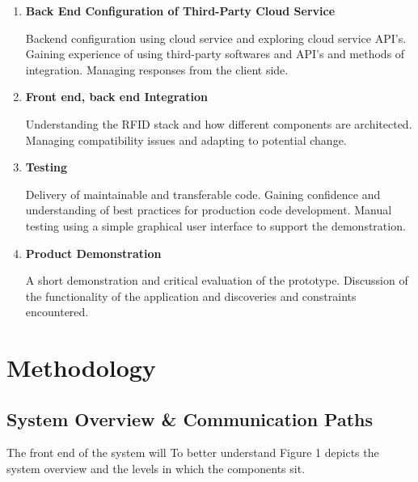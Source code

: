 \documentclass[a4paper, 11pt]{article}
\begin{document}
{\begin{enumerate}
   \item \textbf{Back End Configuration of Third-Party Cloud Service}
   	\begin{flushleft}
	Backend configuration using cloud service and exploring cloud service API's.  Gaining experience of using third-party softwares and API's and methods of integration. Managing responses from the client side. 
	 \end{flushleft}
	 
	    \item \textbf{Front end, back end Integration}
   	\begin{flushleft}Understanding the RFID stack and how different components are architected. Managing compatibility issues and adapting to potential change.
  	\end{flushleft}
 
  \item \textbf{Testing}
   	\begin{flushleft}Delivery of maintainable and transferable code. Gaining confidence and understanding of best practices for production code development. Manual testing using a simple graphical user interface to support the demonstration.
 	\end{flushleft}
 
 \item \textbf{Product Demonstration}
 	\begin{flushleft}A short demonstration and critical evaluation of the prototype. Discussion of the functionality of the application and discoveries and constraints encountered.
 	\end{flushleft}
\end{enumerate}
\clearpage


\section{Methodology}

\subsection{System Overview \& Communication Paths}

The front end of the system will 
To better understand Figure 1 depicts the system overview and the levels in which the components sit.

}
\end{document}
